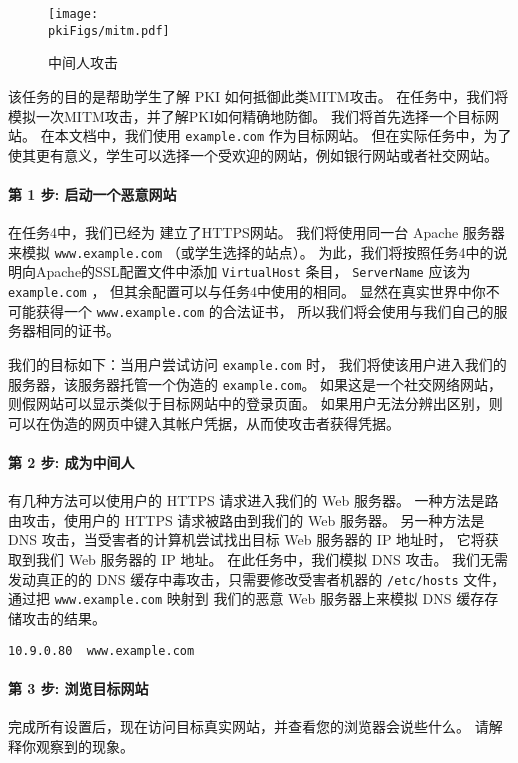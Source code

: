 \begin{figure}[htb]
   \begin{center}
      \texttt{[image: \\pkiFigs/mitm.pdf]}
   \end{center}
   \caption{中间人攻击}
   \label{pki:fig:mitm}
\end{figure}


该任务的目的是帮助学生了解 PKI 如何抵御此类MITM攻击。
在任务中，我们将模拟一次MITM攻击，并了解PKI如何精确地防御。
我们将首先选择一个目标网站。
在本文档中，我们使用 \texttt{example.com} 作为目标网站。
但在实际任务中，为了使其更有意义，学生可以选择一个受欢迎的网站，例如银行网站或者社交网站。


\paragraph{第 1 步: 启动一个恶意网站}
在任务4中，我们已经为 \pkiserver 建立了HTTPS网站。
我们将使用同一台 Apache 服务器来模拟 \texttt{www.example.com} （或学生选择的站点）。
为此，我们将按照任务4中的说明向Apache的SSL配置文件中添加 \texttt{VirtualHost} 条目，
\texttt{ServerName} 应该为 \texttt{example.com} ，
但其余配置可以与任务4中使用的相同。
显然在真实世界中你不可能获得一个 \texttt{www.example.com} 的合法证书，
所以我们将会使用与我们自己的服务器相同的证书。


我们的目标如下：当用户尝试访问 \texttt{example.com} 时，
我们将使该用户进入我们的服务器，该服务器托管一个伪造的 \texttt{example.com}。
如果这是一个社交网络网站，则假网站可以显示类似于目标网站中的登录页面。
如果用户无法分辨出区别，则可以在伪造的网页中键入其帐户凭据，从而使攻击者获得凭据。


\paragraph{第 2 步: 成为中间人}
有几种方法可以使用户的 HTTPS 请求进入我们的 Web 服务器。
一种方法是路由攻击，使用户的 HTTPS 请求被路由到我们的 Web 服务器。
另一种方法是 DNS 攻击，当受害者的计算机尝试找出目标 Web 服务器的 IP 地址时，
它将获取到我们 Web 服务器的 IP 地址。
在此任务中，我们模拟 DNS 攻击。
我们无需发动真正的的 DNS 缓存中毒攻击，只需要修改受害者机器的 \texttt{/etc/hosts} 文件，
通过把 \texttt{www.example.com} 映射到
我们的恶意 Web 服务器上来模拟 DNS 缓存存储攻击的结果。


\begin{lstlisting}
10.9.0.80  www.example.com
\end{lstlisting}


\paragraph{第 3 步: 浏览目标网站}
完成所有设置后，现在访问目标真实网站，并查看您的浏览器会说些什么。
请解释你观察到的现象。



